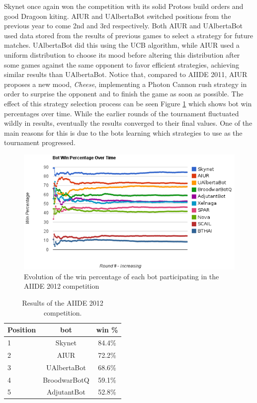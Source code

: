 \documentclass[journal]{IEEEtran}
\begin{document}
Skynet once  again won  the competition with  its solid  Protoss build
orders  and  good  Dragoon  kiting.   AIUR  and  UAlbertaBot  switched
positions from  the previous  year to come  2nd and  3rd respectively.
Both  AIUR  and UAlbertaBot  used  data  stored  from the  results  of
previous games  to select a strategy for  future matches.  UAlbertaBot
did  this  using  the  UCB   algorithm,  while  AIUR  used  a  uniform
distribution  to choose  its  mood before  altering this  distribution
after  some  games  against  the  same  opponent  to  favor  efficient
strategies, achieving  similar results than  UAlbertaBot. Notice that,
compared  to AIIDE 2011,  AIUR proposes  a new  mood, \textit{Cheese},
implementing a  Photon Cannon rush  strategy in order to  surprise the
opponent and  to finish the game  as soon as possible.   The effect of
this strategy selection process can be seen Figure \ref{fig:aiide2012}
which shows bot  win percentages over time.  While  the earlier rounds
of the tournament fluctuated wildly in results, eventually the results
converged to their  final values. One of the main  reasons for this is
due to  the bots  learning which strategies  to use as  the tournament
progressed.

\begin{figure}[t!]
    \centering
    \includegraphics[width=\columnwidth]{figures/aiide2012_v2}
    \caption{Evolution of the win percentage of each bot participating in the AIIDE 2012 competition}
    \label{fig:aiide2012}
\end{figure}


\begin{table}[t!]
\caption{Results of the AIIDE 2012 competition.}
\label{tab:aiide2012}
\begin{small}
\begin{center}
\begin{tabular}{|l|c|c|}
\hline
Position & bot & win \% \\ \hline
1 & Skynet & 84.4\% \\
2 & AIUR & 72.2\% \\
3 & UAlbertaBot & 68.6\% \\
4 & BroodwarBotQ & 59.1\% \\
5 & AdjutantBot & 52.8\% \\ \hline
\end{tabular}
\end{center}
\end{small}
\end{table}
\end{document}
